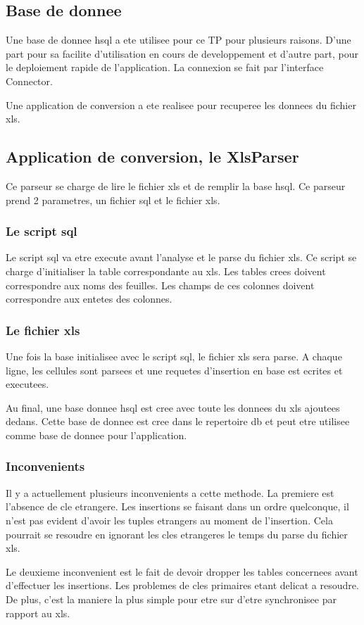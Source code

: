 \subsection{Base de donnee}
Une base de donnee hsql a ete utilisee pour ce TP pour plusieurs raisons. D'une part pour sa facilite d'utilisation en cours de developpement et d'autre part, pour le deploiement rapide de l'application. La connexion se fait par l'interface Connector.

Une application de conversion a ete realisee pour recuperee les donnees du fichier xls.
\subsection{Application de conversion, le XlsParser}
Ce parseur se charge de lire le fichier xls et de remplir la base hsql. Ce parseur prend 2 parametres, un fichier sql et le fichier xls.
\subsubsection{Le script sql}
Le script sql va etre execute avant l'analyse et le parse du fichier xls. Ce script se charge d'initialiser la table correspondante au xls. Les tables crees doivent correspondre aux noms des feuilles. Les champs de ces colonnes doivent correspondre aux entetes des colonnes.
\subsubsection{Le fichier xls}
Une fois la base initialisee avec le script sql, le fichier xls sera parse. A chaque ligne, les cellules sont parsees et une requetes d'insertion en base est ecrites et executees.

Au final, une base donnee hsql est cree avec toute les donnees du xls ajoutees dedans. Cette base de donnee est cree dans le repertoire db et peut etre utilisee comme base de donnee pour l'application.
\subsubsection{Inconvenients}
Il y a actuellement plusieurs inconvenients a cette methode. La premiere est l'absence de cle etrangere. Les insertions se faisant dans un ordre quelconque, il n'est pas evident d'avoir les tuples etrangers au moment de l'insertion. Cela pourrait se resoudre en ignorant les cles etrangeres le temps du parse du fichier xls.

Le deuxieme inconvenient est le fait de devoir dropper les tables concernees avant d'effectuer les insertions. Les problemes de cles primaires etant delicat a resoudre. De plus, c'est la maniere la plus simple pour etre sur d'etre synchronisee par rapport au xls.

